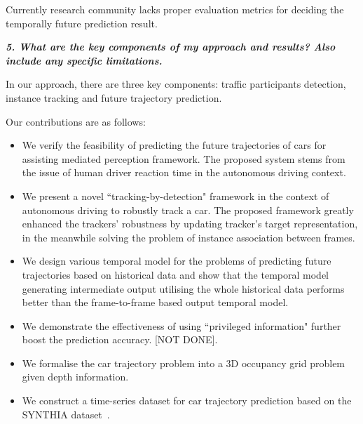 \documentclass[10pt,twocolumn,letterpaper]{article}
\begin{document}
Currently research community lacks proper evaluation metrics for deciding the temporally future prediction result.



\textbf{\emph{5. What are the key components of my approach and results? Also include any specific limitations.}}

In our approach, there are three key components: traffic participants detection, instance tracking and future trajectory prediction.


Our contributions are as follows:
\begin{itemize}

\item We verify the feasibility of predicting the future trajectories of cars for assisting mediated perception framework. The proposed system stems from the issue of human driver reaction time in the autonomous driving context.

\item We present a novel ``tracking-by-detection" framework in the context of autonomous driving to robustly track a car. The proposed framework greatly enhanced the trackers' robustness by updating tracker's target representation, in the meanwhile solving the problem of instance association between frames.

\item We design various temporal model for the problems of predicting future trajectories based on historical data and show that the temporal model generating intermediate output utilising the whole historical data performs better than the frame-to-frame based output temporal model.

\item We demonstrate the effectiveness of using ``privileged information" further boost the prediction accuracy. [NOT DONE].

\item We formalise the car trajectory problem into a 3D occupancy grid problem given depth information.

\item We construct a time-series dataset for car trajectory prediction based on the SYNTHIA dataset~\cite{ros2016synthia}.

\end{itemize}
\end{document}
